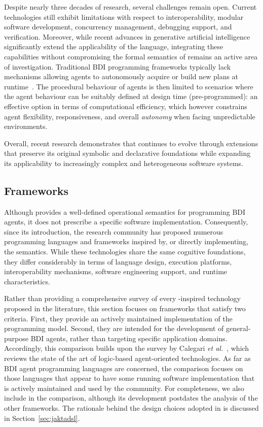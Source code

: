 Despite nearly three decades of research, several challenges remain open. 
%
Current \agentspeak{} technologies still exhibit limitations with respect to interoperability, modular software development, concurrency management, debugging support, and verification. 
%
Moreover, while recent advances in generative artificial intelligence significantly extend the applicability of the language, 
integrating these capabilities without compromising the formal semantics of \agentspeak{} remains an active area of investigation.
%
Traditional \ac{BDI} programming frameworks typically lack mechanisms allowing agents to autonomously acquire
or build new plans at runtime~\cite{SilvaSP09}.
%
The procedural behaviour of \agentspeak{} agents is then limited
to scenarios where the agent behaviour can be suitably defined at design time (pre-programmed):
an effective option in terms of computational efficiency,
which however constrains agent flexibility, responsiveness, and overall \emph{autonomy} when facing unpredictable environments.

Overall, recent research demonstrates that \agentspeak{} continues to evolve through extensions that preserve its original symbolic and declarative foundations 
while expanding its applicability to increasingly complex and heterogeneous software systems. 

\subsection{\agentspeak{} Frameworks}
\label{subsec:agentspeak-frameworks}

Although \agentspeak{} provides a well-defined operational semantics for programming \ac{BDI} agents, 
it does not prescribe a specific software implementation. 
%
Consequently, since its introduction, 
the research community has proposed numerous programming languages and frameworks inspired by, 
or directly implementing, 
the \agentspeak{} semantics. 
%
While these technologies share the same cognitive foundations, 
they differ considerably in terms of language design, 
execution platforms, 
interoperability mechanisms, 
software engineering support, 
and runtime characteristics.

Rather than providing a comprehensive survey of every \agentspeak{}-inspired technology proposed in the literature, 
this section focuses on frameworks that satisfy two criteria. 
%
First, they provide an actively maintained implementation of the \agentspeak{} programming model. 
%
Second, they are intended for the development of general-purpose \ac{BDI} agents, 
rather than targeting specific application domains.
%
Accordingly, 
this comparison builds upon the survey by Calegari \textit{et al.}~\cite{lptech4mas-jaamas35}, 
which reviews the state of the art of logic-based agent-oriented technologies. 
%
As far as \ac{BDI} agent programming languages are concerned,
the comparison focuses on those languages that appear to have some running software implementation
that is actively maintained and used by the community.
%
For completeness, 
we also include \jakta{} in the comparison, 
although its development postdates the analysis of the other frameworks. 
%
The rationale behind the design choices adopted in \jakta{} is discussed in Section~\ref{sec:jaktadsl}.

